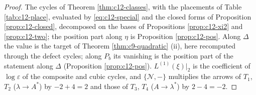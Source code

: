 \begin{proof}
The cycles of Theorem \ref{thm:c12-classes}, with the placements of Table \ref{tab:c12-place}, evaluated by \eqref{eq:c12-special} and the closed forms of Proposition \ref{prop:c12-closed}, decomposed on the bases of Propositions \ref{prop:c12-xi2} and \ref{prop:c12-two}; the position part along $\eta$ is Proposition \ref{prop:c12-pos}. Along $\Delta$ the value is the target of Theorem \ref{thm:c9-quadratic} (ii), here recomputed through the defect cycles; along $P_b$ its vanishing is the position part of the statement along $\Delta$ (Proposition \ref{prop:c12-pos}). $L^{(1)}(\xi)|_2$ is the coefficient of $\log\varepsilon$ of the composite and cubic cycles, and $\{\mathcal N,-\}$ multiplies the arrows of $T_1$, $T_2$ ($\lambda\to A^*$) by $-2+4=2$ and those of $T_3$, $T_4$ ($A\to\lambda^*$) by $2-4=-2$.
\end{proof}

